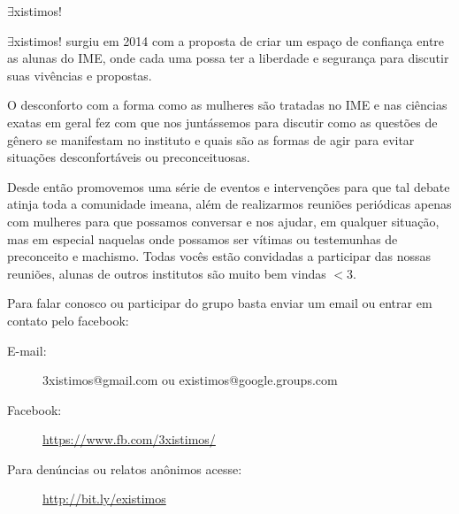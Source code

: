 \begin{subsecao}{$\exists$xistimos!}



$\exists$xistimos! surgiu em 2014 com a proposta de criar um espaço de
confiança entre as alunas do IME, onde cada uma possa ter a liberdade e
segurança para discutir suas vivências e propostas.


O desconforto com a forma como as mulheres são tratadas no IME e nas ciências
exatas em geral fez com que nos juntássemos para discutir como as questões de
gênero se manifestam no instituto e quais são as formas de agir para evitar
situações desconfortáveis ou preconceituosas.

Desde então promovemos uma série de eventos e intervenções para que tal debate
atinja toda a comunidade imeana, além de realizarmos reuniões periódicas apenas
com mulheres para que possamos conversar e nos ajudar, em qualquer situação,
mas em especial naquelas onde possamos ser vítimas ou testemunhas de  
preconceito e machismo. Todas vocês estão convidadas a participar das nossas  
reuniões, alunas de outros institutos são muito bem vindas $<$3.

Para falar conosco ou participar do grupo basta enviar um email ou entrar em
contato pelo facebook:


\begin{description}

\item[E-mail:] 3xistimos@gmail.com ou existimos@google.groups.com
\item[Facebook:] \url{https://www.fb.com/3xistimos/}
\item[Para denúncias ou relatos anônimos acesse:] \url{http://bit.ly/existimos}

\end{description}


\end{subsecao}

